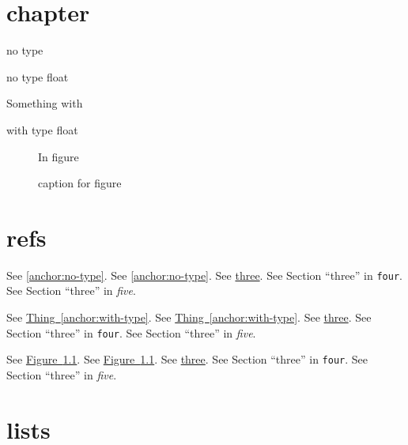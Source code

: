 \documentclass{book}
\begin{document}
\chapter{chapter}
\label{anchor:chapter}%

\begin{TexinfoFloat}
no type
\caption[short no type float]{no type float}


\label{anchor:no-type}%
\end{TexinfoFloat}

\begin{TexinfoFloatThing}
Something with
\caption[short with type float]{with type float}


\label{anchor:with-type}%
\end{TexinfoFloatThing}

\begin{figure}
In figure
\caption[short caption for figure]{caption for figure}


\label{anchor:my-figure}%
\end{figure}

\chapter{refs}

See \hyperref[anchor:no-type]{\ref*{anchor:no-type}}.
See \hyperref[anchor:no-type]{\ref*{anchor:no-type}}.
See \hyperref[anchor:no-type]{three}.
See Section ``three'' in \texttt{four}.
See Section ``three'' in \textit{five}.

See \hyperref[anchor:with-type]{Thing~\ref*{anchor:with-type}}.
See \hyperref[anchor:with-type]{Thing~\ref*{anchor:with-type}}.
See \hyperref[anchor:with-type]{three}.
See Section ``three'' in \texttt{four}.
See Section ``three'' in \textit{five}.

See \hyperref[anchor:my-figure]{Figure~\ref*{anchor:my-figure}}.
See \hyperref[anchor:my-figure]{Figure~\ref*{anchor:my-figure}}.
See \hyperref[anchor:my-figure]{three}.
See Section ``three'' in \texttt{four}.
See Section ``three'' in \textit{five}.

\chapter{lists}

\listoffigures
{}
\end{document}

